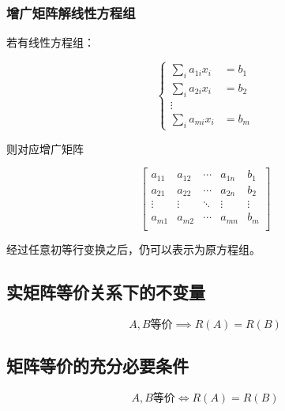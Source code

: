 \documentclass{article}
\begin{document}
\subsubsection{增广矩阵解线性方程组}

若有线性方程组：

\[\left\{\begin{aligned}
        \sum_i a_{1i}x_i & =b_1 \\
        \sum_i a_{2i}x_i & =b_2 \\
        \vdots                  \\
        \sum_i a_{mi}x_i & =b_m
    \end{aligned}\right.\]

则对应增广矩阵

\[\begin{bmatrix}
        a_{11} & a_{12} & \cdots & a_{1n} & b_1    \\
        a_{21} & a_{22} & \cdots & a_{2n} & b_2    \\
        \vdots & \vdots & \ddots & \vdots & \vdots \\
        a_{m1} & a_{m2} & \cdots & a_{mn} & b_m    \\
    \end{bmatrix}\]

经过任意初等行变换之后，仍可以表示为原方程组。

\subsection{实矩阵等价关系下的不变量}

\begin{theorem}[等价矩阵秩相同]
    \[A,B\text{等价}\implies R\left(A\right)=R\left(B\right)\]
\end{theorem}

\subsection{矩阵等价的充分必要条件}

\begin{theorem}[矩阵等价的充要条件是同秩]
    \[A,B\text{等价}\iff R\left(A\right)=R\left(B\right)\]
\end{theorem}
\end{document}
